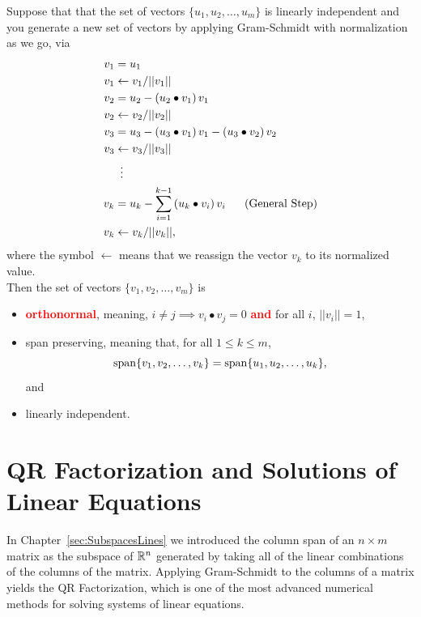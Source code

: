 \begin{tcolorbox}[title=\textcolor{red}{\Large \bf Gram-Schmidt Process with Normalization}]
Suppose that that the set of vectors $\{ u_1, u_2, \ldots, u_m\}$ is linearly independent and you generate a new set of vectors by applying Gram-Schmidt with normalization as we go, via 
 \begin{equation}
 \label{eq:GramSchmidtWithNormalization}
 \begin{aligned}
 v_1 & = u_1 \\
 v_1 & \leftarrow v_1/||v_1|| \\
 v_2 &= u_2 - \left(u_2 \bullet v_1 \right) v_1 \bigskip \\
 v_2 & \leftarrow  v_2 / ||v_2|| \\
 v_3 &= u_3 -\left( u_3 \bullet v_1 \right) v_1 - \left(u_3 \bullet v_2 \right) v_2 \\
 v_3 & \leftarrow  v_3/||v_3|| \\
 & ~\vdots \\
	v_k &= u_k  - \sum_{i=1}^{k-1} \left(u_k \bullet v_i\right) v_i~~~~~\text{(General Step)} \\
	v_k & \leftarrow  v_k/||v_k||,
	\end{aligned}
\end{equation}
where the symbol $\leftarrow $ means that we reassign the vector $v_k$ to its normalized value.\\

Then the set of vectors $\{ v_1, v_2,  \ldots, v_m\}$ is 
\begin{itemize}
    \item \textcolor{red}{\bf orthonormal}, meaning, $i \neq j \implies v_i \bullet v_j = 0$ \textcolor{red}{\bf and} for all $i$, $||v_i||=1$,
    \item span preserving, meaning that, for all $1 \le k \le m$, 
    $$
        \mathrm{span} \{ v_1, v_2, \ldots, v_k \} = \mathrm{span} \{ u_1, u_2, \ldots, u_k \},
    $$
    and
        \item linearly independent.
\end{itemize}
\end{tcolorbox}



\section{QR Factorization and Solutions of Linear Equations}
\label{sec:QRfactorization}

In Chapter~\ref{sec:SubspacesLines} we introduced the column span of an $n \times m$ matrix as the subspace of $\mathbb R^n$ generated by taking all of the linear combinations of the columns of the matrix. Applying Gram-Schmidt to the columns of a matrix yields the QR Factorization, which is one of the most advanced numerical methods for solving systems of linear equations.

